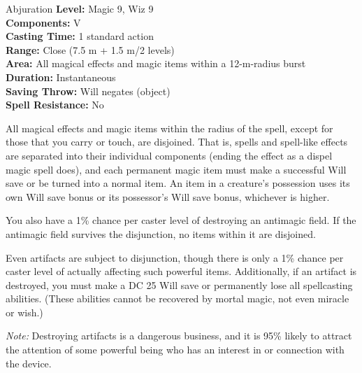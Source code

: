 {Abjuration}
{
	\textbf{Level:}
	Magic 9, Wiz 9\\
	\textbf{Components:}
	V\\
	\textbf{Casting Time:}
	1 standard action\\
	\textbf{Range:}
	Close (7.5 m + 1.5 m/2 levels)\\
	\textbf{Area:}
	All magical effects and magic items within a 12-m-radius burst\\
	\textbf{Duration:}
	Instantaneous\\
	\textbf{Saving Throw:}
	Will negates (object)\\
	\textbf{Spell Resistance:}
	No\\
}
{
	All magical effects and magic items within the radius of the spell, except for those that you carry or touch, are disjoined. That is, spells and spell-like effects are separated into their individual components (ending the effect as a dispel magic spell does), and each permanent magic item must make a successful Will save or be turned into a normal item. An item in a creature's possession uses its own Will save bonus or its possessor's Will save bonus, whichever is higher.

	You also have a 1\% chance per caster level of destroying an antimagic field. If the antimagic field survives the disjunction, no items within it are disjoined.

	Even artifacts are subject to disjunction, though there is only a 1\% chance per caster level of actually affecting such powerful items. Additionally, if an artifact is destroyed, you must make a DC 25 Will save or permanently lose all spellcasting abilities. (These abilities cannot be recovered by mortal magic, not even miracle or wish.)

	\textit{Note:} Destroying artifacts is a dangerous business, and it is 95\% likely to attract the attention of some powerful being who has an interest in or connection with the device.

}
